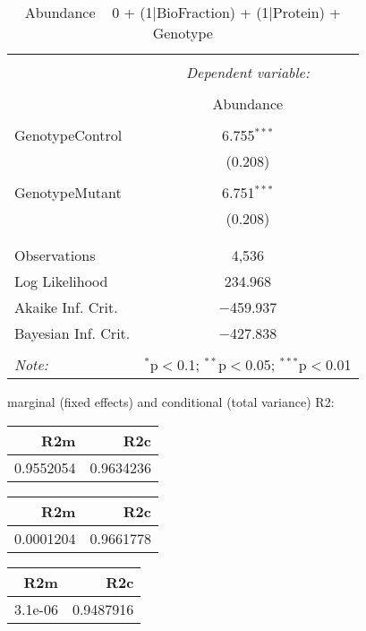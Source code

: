 \documentclass[11pt]{report}
\begin{document}
\begin{table}[!htbp] \centering 
  \caption{Abundance ~ 0 + (1|BioFraction) + (1|Protein) + Genotype} 
  \label{} 
\begin{tabular}{@{\extracolsep{5pt}}lc} 
\\[-1.8ex]\hline 
\hline \\[-1.8ex] 
 & \multicolumn{1}{c}{\textit{Dependent variable:}} \\ 
\cline{2-2} 
\\[-1.8ex] & Abundance \\ 
\hline \\[-1.8ex] 
 GenotypeControl & 6.755$^{***}$ \\ 
  & (0.208) \\ 
  & \\ 
 GenotypeMutant & 6.751$^{***}$ \\ 
  & (0.208) \\ 
  & \\ 
\hline \\[-1.8ex] 
Observations & 4,536 \\ 
Log Likelihood & 234.968 \\ 
Akaike Inf. Crit. & $-$459.937 \\ 
Bayesian Inf. Crit. & $-$427.838 \\ 
\hline 
\hline \\[-1.8ex] 
\textit{Note:}  & \multicolumn{1}{r}{$^{*}$p$<$0.1; $^{**}$p$<$0.05; $^{***}$p$<$0.01} \\ 
\end{tabular} 
\end{table} 
marginal (fixed effects) and conditional (total variance) R2:

\begin{tabular}{r|r}
\hline
R2m & R2c\\
\hline
0.9552054 & 0.9634236\\
\hline
\end{tabular}

\begin{tabular}{r|r}
\hline
R2m & R2c\\
\hline
0.0001204 & 0.9661778\\
\hline
\end{tabular}

\begin{tabular}{r|r}
\hline
R2m & R2c\\
\hline
3.1e-06 & 0.9487916\\
\hline
\end{tabular}
\end{document}
